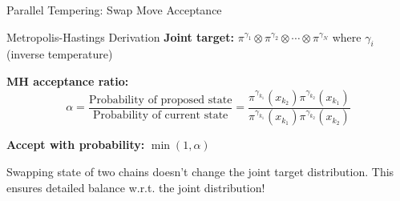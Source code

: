 \documentclass[aspectratio=169]{beamer}
\begin{document}
\begin{frame}{Parallel Tempering: Swap Move Acceptance}
	\begin{block}{Metropolis-Hastings Derivation}
		\textbf{Joint target:} $\pi^{\gamma_1} \otimes \pi^{\gamma_2} \otimes \cdots \otimes \pi^{\gamma_N}$ where $\gamma_i$ (inverse temperature)

		\textbf{MH acceptance ratio:}
		$$\alpha = \frac{\text{Probability of proposed state}}{\text{Probability of current state}} = \frac{\pi^{\gamma_{k_1}}(x_{k_2})\pi^{\gamma_{k_2}}(x_{k_1})}{\pi^{\gamma_{k_1}}(x_{k_1})\pi^{\gamma_{k_2}}(x_{k_2})}$$

		\textbf{Accept with probability:} $\min(1, \alpha)$

		Swapping state of two chains doesn’t change the joint target distribution.
		This ensures detailed balance w.r.t. the joint distribution!
	\end{block}



\end{frame}
\end{document}
